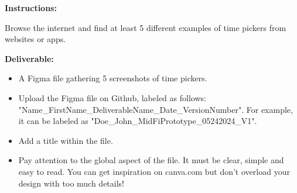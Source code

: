 \makeheaderfiles

\textbf{Instructions:}

Browse the internet and find at least 5 different examples of time pickers from websites or apps.

\textbf{Deliverable:}

\begin{itemize}
\item A Figma file gathering 5 screenshots of time pickers.
\item Upload the Figma file on Github, labeled as follows: "Name\_FirstName\_DeliverableName\_Date\_VersionNumber". For example, it can be labeled as "Doe\_John\_MidFiPrototype\_05242024\_V1".
\item Add a title within the file.
\item Pay attention to the global aspect of the file. It must be clear, simple and easy to read. You can get inspiration on canva.com but don't overload your design with too much details!
\end{itemize}

